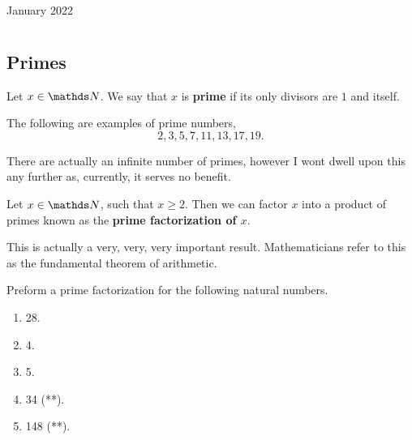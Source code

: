 \documentclass[12pt,oneside]{book} %
\begin{document}
	\renewcommand*{\term}{Term 2} %
	\renewcommand*{\coursecode}{MCR3U} %
	\renewcommand*{\coursename}{Course Name} %
	\renewcommand*{\thelecnum}{6} %
	\renewcommand*{\profname}{Prof Name} %
	\renewcommand*{\colink}{http://www.student.math.uwaterloo.ca/~c2kent} %
	\clearpage
	\pagestyle{classlecture}
\begin{lec}{January 2022}
	\chapter{\chapname\chaplec}
  
  \section{Primes}

  \begin{defn}
      Let $x \in \N$. We say that $x$ is \textbf{prime} if its only divisors are $1$ and itself.
  \end{defn}

  \begin{ex}
    The following are examples of prime numbers,
    \[
          2,3,5,7,11,13,17,19
    .\] 
  \end{ex}
  
  There are actually an infinite number of primes, however I wont dwell upon this any further as, currently, it serves no
  benefit.

  \begin{thrm}
    Let $x \in \N$, such that $x \geq 2$. Then we can factor $x$ into a product of primes known as the
    \textbf{prime factorization of $x$}.
  \end{thrm}

  This is actually a very, very, very important result. Mathematicians refer to this as the fundamental theorem of
  arithmetic.

  \begin{ex}
    Preform a prime factorization for the following natural numbers.
    \begin{enumerate}[label=(\alph*)]
      \item 28.
      \item 4.
      \item 5.
      \item 34 \hfill (**).
      \item 148 \hfill (**).
    \end{enumerate}
  \end{ex}


\end{lec}
\end{document}
